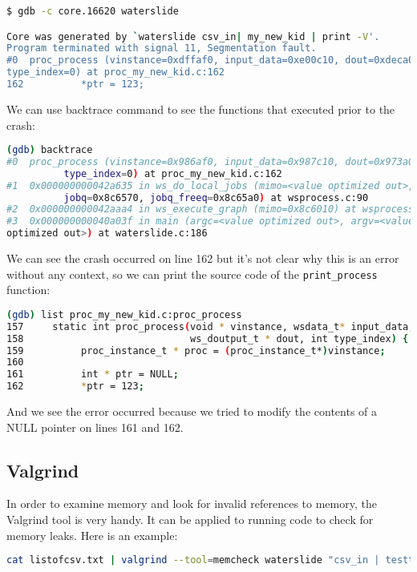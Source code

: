 \documentclass[11pt]{article}
\begin{document}
\begin{lstlisting}[language=bash]
$ gdb -c core.16620 waterslide

Core was generated by `waterslide csv_in| my_new_kid | print -V'.
Program terminated with signal 11, Segmentation fault.
#0  proc_process (vinstance=0xdffaf0, input_data=0xe00c10, dout=0xdeca08,
type_index=0) at proc_my_new_kid.c:162
162          *ptr = 123;
\end{lstlisting}

We can use backtrace command to see the functions that executed prior to the
crash:

\begin{lstlisting}[language=bash]
(gdb) backtrace
#0  proc_process (vinstance=0x986af0, input_data=0x987c10, dout=0x973a08,
          type_index=0) at proc_my_new_kid.c:162
#1  0x000000000042a635 in ws_do_local_jobs (mimo=<value optimized out>, 
          jobq=0x8c6570, jobq_freeq=0x8c65a0) at wsprocess.c:90
#2  0x000000000042aaa4 in ws_execute_graph (mimo=0x8c6010) at wsprocess.c:241
#3  0x000000000040a03f in main (argc=<value optimized out>, argv=<value
optimized out>) at waterslide.c:186
\end{lstlisting}


We can see the crash occurred on line 162 but it's not clear why this is an 
error without any context, so we can print the source code of the 
\texttt{print\_process} function:

\begin{lstlisting}[language=bash]
(gdb) list proc_my_new_kid.c:proc_process
157     static int proc_process(void * vinstance, wsdata_t* input_data,
158                             ws_doutput_t * dout, int type_index) {
159          proc_instance_t * proc = (proc_instance_t*)vinstance;
160
161          int * ptr = NULL;
162          *ptr = 123;
\end{lstlisting}

And we see the error occurred because we tried to modify the contents of a
NULL pointer on lines 161 and 162.


\subsection {Valgrind}
In order to examine memory and look for invalid references to memory, the 
Valgrind tool is very handy.  It can be applied to running code to check for 
memory leaks.  Here is an example:

\begin{lstlisting}[language=bash]
cat listofcsv.txt | valgrind --tool=memcheck waterslide "csv_in | testtool"
\end{lstlisting}
\end{document}
